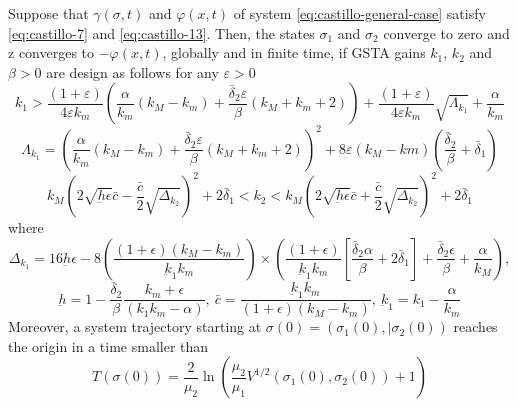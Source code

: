    \begin{theorem}
      \label{th:cas}
      Suppose that $\gamma(\sigma, t)$ and $\varphi(x, t)$ of system \eqref{eq:castillo-general-case} satisfy \eqref{eq:castillo-7} and \eqref{eq:castillo-13}. Then, the states $\sigma_1$ and $\sigma_2$ converge to zero and z converges to $-\varphi(x, t)$, globally and in finite time, if GSTA gains $k_1$, $k_2$ and $\beta > 0$ are design as follows for any $\varepsilon > 0$
      \begin{equation}
         k_1 > \frac{(1+\varepsilon)}{4\varepsilon k_m}\left(\frac{\alpha}{k_m}(k_M - k_m) + \frac{\bar{\delta}_2\varepsilon}{\beta}(k_M + k_m + 2)\right) + \frac{(1+\varepsilon)}{4\varepsilon k_m}\sqrt{\Lambda_{k_1}} + \frac{\alpha}{k_m}
      \end{equation}
      \begin{equation}
         \Lambda_{k_1} = \left(\frac{\alpha}{k_m}(k_M - k_m) + \frac{\bar{\delta}_2\varepsilon}{\beta}(k_M + k_m + 2)\right)^2 + 8\varepsilon(k_M - km) \left(\frac{\bar{\delta}_2}{\beta} + \bar{\delta}_1\right)
      \end{equation}
      \begin{equation}
         k_M \left(2\sqrt{\underbar{h}\epsilon}\bar{c}- \frac{\bar{c}}{2}\sqrt{\Delta_{k_2}}\right)^2 + 2\bar{\delta}_1 < k_2 < k_M \left(2\sqrt{\underbar{h}\epsilon}\bar{c} + \frac{\bar{c}}{2}\sqrt{\Delta_{k_2}}\right)^2 + 2\bar{\delta}_1 
      \end{equation}
      where
      \begin{equation*}
         \Delta_{k_1} =16\underbar{h}\epsilon - 8 \left(\frac{(1+\epsilon)(k_M - k_m)}{\underbar{k}_1 k_m}\right) \times \left(\frac{(1+\epsilon)}{\underbar{k}_1k_m}\left[\frac{\bar{\delta}_2\alpha}{\beta}+2\bar{\delta}_1\right]+\frac{\bar{\delta}_2\epsilon}{\beta} + \frac{\alpha}{k_M}\right),
      \end{equation*}
      \begin{equation*}
         \underbar{h} = 1 - \frac{\bar{\delta}_2}{\beta} \frac{k_m + \epsilon}{(k_1k_m - \alpha)}, \ \bar{c} = \frac{\underbar{k}_1k_m}{(1+\epsilon)(k_M - k_m)}, \ \underbar{k}_1 = k_1 - \frac{\alpha}{k_m}
      \end{equation*}
      Moreover, a system trajectory starting at $\sigma(0) = (\sigma_1(0), |\sigma_2(0))$ reaches the origin in a time smaller than 
      \begin{equation}
         T(\sigma(0)) = \frac{2}{\mu_2} \ln \left(\frac{\mu_2}{\mu_1}V^{1/2}(\sigma_1(0), \sigma_2(0)) + 1\right)
      \end{equation}
   \end{theorem}

